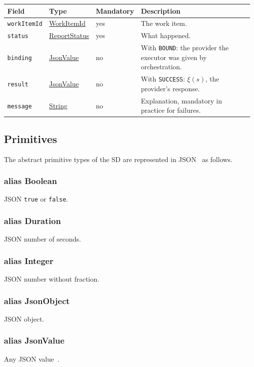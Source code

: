 \documentclass[a4paper]{arrowhead}
\newcommand{\mref}[1]{{\textcolor{ArrowheadPurple}{\hyperref[sec:model:#1]{#1}}}}
\newcommand{\pdef}[1]{{\textcolor{ArrowheadGrey}{#1\label{sec:model:primitives:#1}\label{sec:model:primitives:#1s}}}}
\newcommand{\pref}[1]{{\textcolor{ArrowheadGrey}{\hyperref[sec:model:primitives:#1]{#1}}}}
\begin{document}
{\small
\begin{longtable}{|p{3.7cm}|p{4.2cm}|p{1.6cm}|p{6.3cm}|}

\hline
\rowcolor{gray!33} Field & Type & Mandatory & Description \\ \hline
\endhead
\texttt{workItemId} & \pref{WorkItemId} & yes & The work item. \\ \hline
\texttt{status} & \mref{ReportStatus} & yes & What happened. \\ \hline
\texttt{binding} & \pref{JsonValue} & no & With \texttt{BOUND}: the provider the executor was given by orchestration. \\ \hline
\texttt{result} & \pref{JsonValue} & no & With \texttt{SUCCESS}: $\xi(s)$, the provider's response. \\ \hline
\texttt{message} & \pref{String} & no & Explanation, mandatory in practice for failures. \\ \hline
\end{longtable}
}


\subsection{Primitives}
\label{sec:model:primitives}
The abstract primitive types of the SD are represented in JSON~\cite{rfc8259} as follows.
\subsubsection*{alias \pdef{Boolean}}
JSON \texttt{true} or \texttt{false}.

\subsubsection*{alias \pdef{Duration}}
JSON number of seconds.

\subsubsection*{alias \pdef{Integer}}
JSON number without fraction.

\subsubsection*{alias \pdef{JsonObject}}
JSON object.

\subsubsection*{alias \pdef{JsonValue}}
Any JSON value~\cite{rfc8259}.
\end{document}
